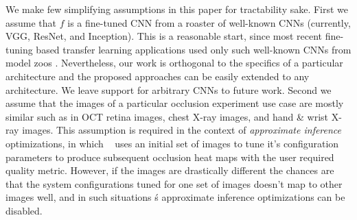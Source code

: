 We make few simplifying assumptions in this paper for tractability sake.
First we assume that $f$ is a fine-tuned CNN from a roaster of well-known CNNs (currently, VGG, ResNet, and Inception).
This is a reasonable start, since most recent fine-tuning based transfer learning applications used only such well-known CNNs from model zoos \cite{caffemodelzoo, tfmodelzoo}.
Nevertheless, our work is orthogonal to the specifics of a particular architecture and the proposed approaches can be easily extended to any architecture.
We leave support for arbitrary CNNs to future work.
Second we assume that the images of a particular occlusion experiment use case are mostly similar such as in OCT retina images, chest X-ray images, and hand \& wrist X-ray images.
This assumption is required in the context of \textit{approximate inference} optimizations, in which \system~ uses an initial set of images to tune it's configuration parameters to produce subsequent occlusion heat maps with the user required quality metric.
However, if the images are drastically different the chances are that the system configurations tuned for one set of images doesn't map to other images well, and in such situations \system\'s approximate inference optimizations can be disabled.
